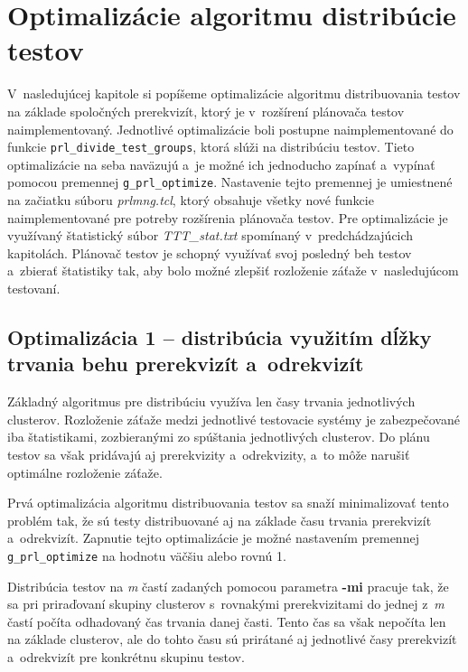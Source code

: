 %
%
\chapter{Optimalizácie algoritmu distribúcie testov}
\label{kapitola:optimalizacie}
V~nasledujúcej kapitole si popíšeme optimalizácie algoritmu distribuovania
testov na základe spoločných prerekvizít, ktorý je v~rozšírení plánovača 
testov naimplementovaný. 
Jednotlivé optimalizácie boli postupne naimplementované do funkcie 
\texttt{prl\_divide\_test\_groups}, ktorá slúži na distribúciu testov.
Tieto optimalizácie na seba naväzujú a~je možné ich jednoducho zapínať a~vypínať 
pomocou  premennej \texttt{g\_prl\_optimize}. 
Nastavenie tejto premennej je umiestnené 
na začiatku súboru \textit{prlmng.tcl}, ktorý obsahuje všetky nové funkcie
naimplementované pre potreby rozšírenia plánovača testov.
Pre optimalizácie je využívaný štatistický súbor \textit{TTT\_stat.txt}
spomínaný v~predchádzajúcich kapitolách. Plánovač testov je schopný
využívať svoj posledný beh testov a~zbierať štatistiky tak, aby bolo možné
zlepšiť rozloženie záťaže v~nasledujúcom testovaní.

\section{Optimalizácia 1 -- distribúcia využitím dĺžky trvania behu 
prerekvizít a~odrekvizít}
\label{sekcia:optimalizacia1}
Základný algoritmus pre distribúciu využíva len časy trvania jednotlivých clusterov.
Rozloženie záťaže medzi jednotlivé testovacie systémy je zabezpečované iba
štatistikami, zozbieranými zo spúštania jednotlivých clusterov.
Do plánu testov sa však pridávajú aj prerekvizity a~odrekvizity, a~to môže
narušiť optimálne rozloženie záťaže. 

Prvá optimalizácia algoritmu distribuovania testov sa snaží minimalizovať
tento problém tak, že sú testy distribuované aj na základe
času trvania prerekvizít a~odrekvizít. Zapnutie tejto optimalizácie
je možné nastavením premennej \texttt{g\_prl\_optimize} na hodnotu 
väčšiu alebo rovnú 1.

Distribúcia testov na \textit{m} častí zadaných pomocou parametra \textbf{-mi}
pracuje tak, že sa pri priraďovaní skupiny clusterov s~rovnakými prerekvizitami
do jednej z~\textit{m} častí počíta odhadovaný čas trvania danej časti.
Tento čas sa však nepočíta len na základe clusterov, ale do tohto času 
sú prirátané aj jednotlivé časy prerekvizít a~odrekvizít pre konkrétnu 
skupinu testov.

